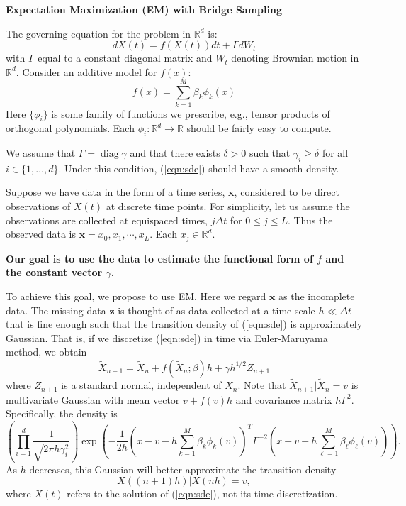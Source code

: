 \documentclass[12pt]{article}
\newcommand{\opdiag}{\ensuremath{\operatorname{diag}}}
\begin{document}
\begin{center}
\textbf{Expectation Maximization (EM) with Bridge Sampling}
\end{center}
The governing equation for the problem in $\mathbb{R}^d$ is:
\begin{equation} \label{eqn:sde}
dX(t) = f(X(t)) dt + \Gamma dW_t
\end{equation}
with $\Gamma$ equal to a constant diagonal matrix and $W_t$ denoting Brownian motion in $\mathbb{R}^d$.  Consider an additive model for $f(x)$:
\begin{equation} \label{eqn:parameteric}
f(x) = \sum_{k=1}^{M} \beta_k \phi_k (x)
\end{equation} 
Here $\{\phi_i\}$ is some family of functions we prescribe, e.g., tensor products of orthogonal polynomials.  Each $\phi_i : \mathbb{R}^d \to \mathbb{R}$ should be fairly easy to compute.

We assume that $\Gamma = \opdiag \gamma$ and that there exists $\delta > 0$ such that $\gamma_i \geq \delta$ for all $i \in \{1, \ldots, d\}$.  Under this condition, (\ref{eqn:sde}) should have a smooth density.

Suppose we have data in the form of a time series, $\mathbf{x}$, considered to be direct observations of $X(t)$ at discrete time points.  For simplicity, let us assume the observations are collected at equispaced times, $j \Delta t$ for $0 \leq j \leq L$. Thus the observed data is $\mathbf{x} = x_0, x_1, \cdots, x_L$.  Each $x_j \in \mathbb{R}^d$.

\textbf{Our goal is to use the data to estimate the functional form of $f$ and the constant vector $\gamma$.}

To achieve this goal, we propose to use EM.  Here we regard $\mathbf{x}$ as the incomplete data.  The missing data $\mathbf{z}$ is thought of as data collected at a time scale $h \ll \Delta t$ that is fine enough such that the transition density of (\ref{eqn:sde}) is approximately Gaussian.  That is, if we discretize (\ref{eqn:sde}) in time via Euler-Maruyama method, we obtain
\begin{equation} \label{eqn:euler}
\widetilde{X}_{n+1} = \widetilde{X}_n + f(\widetilde{X}_n; \beta) h + \gamma h^{1/2} Z_{n+1}
\end{equation}
where $Z_{n+1}$ is a standard normal, independent of $X_n$.  Note that $\widetilde{X}_{n+1} | \widetilde{X}_n = v$ is multivariate Gaussian with mean vector $v + f(v) h$ and covariance matrix $h \Gamma^2$.  Specifically, the density is
$$
\left( \prod_{i=1}^d \frac{1}{\sqrt{2 \pi h \gamma_i^2}} \right)
\exp \left( -\frac{1}{2h} (x - v - h \sum_{k=1}^M \beta_k \phi_k(v))^T \Gamma^{-2} (x - v - h \sum_{\ell=1}^M \beta_\ell \phi_\ell(v)) \right).
$$
As $h$ decreases, this Gaussian will better approximate the transition density
$$
X((n+1)h) | X(nh) = v,
$$
where $X(t)$ refers to the solution of (\ref{eqn:sde}), not its time-discretization.
\end{document}

